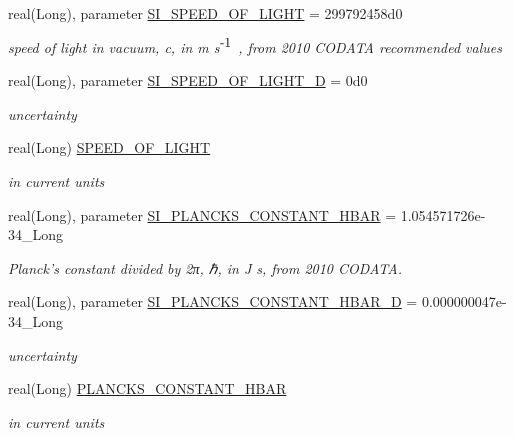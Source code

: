 \begin{DoxyCompactItemize}
real(Long), parameter \hyperlink{namespacephys__cons_ae265fad966cfc841f9a073a52955d742}{SI\_\-SPEED\_\-OF\_\-LIGHT} = 299792458d0
\begin{DoxyCompactList}\small\item\em speed of light in vacuum, c, in m s$^{\mbox{-\/1}}$ , from 2010 CODATA recommended values \item\end{DoxyCompactList}\item 
real(Long), parameter \hyperlink{namespacephys__cons_a5547546b06eb8853e52e304b25cc7596}{SI\_\-SPEED\_\-OF\_\-LIGHT\_\-D} = 0d0
\begin{DoxyCompactList}\small\item\em uncertainty \item\end{DoxyCompactList}\item 
real(Long) \hyperlink{namespacephys__cons_ac31faa4bb5e82aecbdffa3b3d43a1736}{SPEED\_\-OF\_\-LIGHT}
\begin{DoxyCompactList}\small\item\em in current units \item\end{DoxyCompactList}\item 
real(Long), parameter \hyperlink{namespacephys__cons_ab49e79c21c913c5857dedf2c555d2c21}{SI\_\-PLANCKS\_\-CONSTANT\_\-HBAR} = 1.054571726e-\/34\_\-Long
\begin{DoxyCompactList}\small\item\em Planck's constant divided by 2π, ℏ, in J s, from 2010 CODATA. \item\end{DoxyCompactList}\item 
real(Long), parameter \hyperlink{namespacephys__cons_af8ab82739d58ac3a1e1d9c97d3cfb4da}{SI\_\-PLANCKS\_\-CONSTANT\_\-HBAR\_\-D} = 0.000000047e-\/34\_\-Long
\begin{DoxyCompactList}\small\item\em uncertainty \item\end{DoxyCompactList}\item 
real(Long) \hyperlink{namespacephys__cons_af0b754235993060b14fc81b7d1f702a5}{PLANCKS\_\-CONSTANT\_\-HBAR}
\begin{DoxyCompactList}\small\item\em in current units \item\end{DoxyCompactList}\item 

\end{DoxyCompactItemize}
